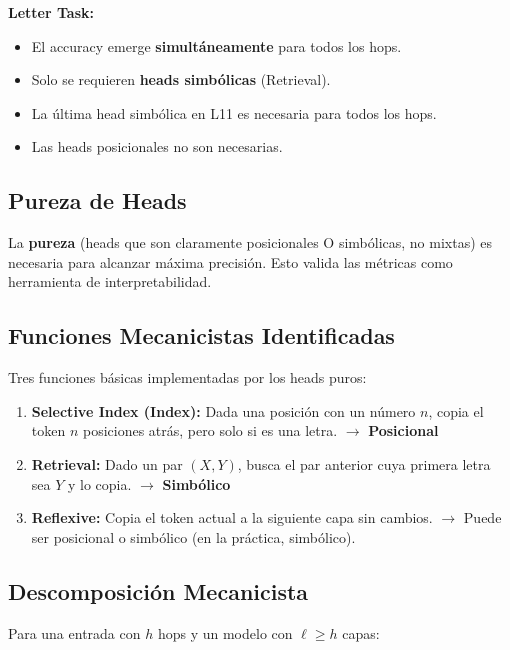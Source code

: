 \documentclass[conference]{IEEEtran}
\begin{document}
\textbf{Letter Task:}
\begin{itemize}
    \item El accuracy emerge \textbf{simult\'aneamente} para todos los hops.
    \item Solo se requieren \textbf{heads simb\'olicas} (Retrieval).
    \item La \'ultima head simb\'olica en L11 es necesaria para todos los hops.
    \item Las heads posicionales no son necesarias.
\end{itemize}

\subsection{Pureza de Heads}

La \textbf{pureza} (heads que son claramente posicionales O simb\'olicas, no mixtas) es necesaria para alcanzar m\'axima precisi\'on. Esto valida las m\'etricas como herramienta de interpretabilidad.

\subsection{Funciones Mecanicistas Identificadas}

Tres funciones b\'asicas implementadas por los heads puros:

\begin{enumerate}
    \item \textbf{Selective Index (Index):} Dada una posici\'on con un n\'umero $n$, copia el token $n$ posiciones atr\'as, pero solo si es una letra. $\rightarrow$ \textbf{Posicional}

    \item \textbf{Retrieval:} Dado un par $(X,Y)$, busca el par anterior cuya primera letra sea $Y$ y lo copia. $\rightarrow$ \textbf{Simb\'olico}

    \item \textbf{Reflexive:} Copia el token actual a la siguiente capa sin cambios. $\rightarrow$ Puede ser posicional o simb\'olico (en la pr\'actica, simb\'olico).
\end{enumerate}

\subsection{Descomposici\'on Mecanicista}

Para una entrada con $h$ hops y un modelo con $\ell \ge h$ capas:
\end{document}
